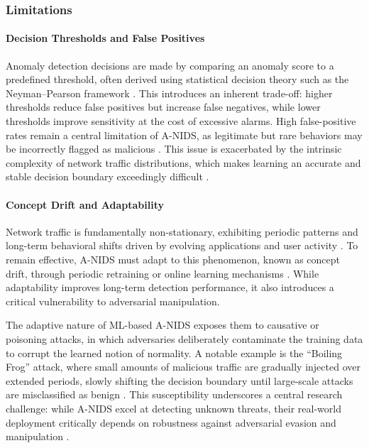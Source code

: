 \subsubsection{Limitations}
\paragraph{Decision Thresholds and False Positives}
Anomaly detection decisions are made by comparing an anomaly score to a predefined threshold, often derived using statistical decision theory such as the Neyman–Pearson framework \cite{brauckhoff2009applying}. This introduces an inherent trade-off: higher thresholds reduce false positives but increase false negatives, while lower thresholds improve sensitivity at the cost of excessive alarms. High false-positive rates remain a central limitation of A-NIDS, as legitimate but rare behaviors may be incorrectly flagged as malicious \cite{madani2018robustness}. This issue is exacerbated by the intrinsic complexity of network traffic distributions, which makes learning an accurate and stable decision boundary exceedingly difficult \cite{bao2018mitigating}.

\paragraph{Concept Drift and Adaptability}
Network traffic is fundamentally non-stationary, exhibiting periodic patterns and long-term behavioral shifts driven by evolving applications and user activity \cite{madani2018robustness}. To remain effective, A-NIDS must adapt to this phenomenon, known as concept drift, through periodic retraining or online learning mechanisms \cite{vitorino2023sok}. While adaptability improves long-term detection performance, it also introduces a critical vulnerability to adversarial manipulation.

The adaptive nature of ML-based A-NIDS exposes them to causative or poisoning attacks, in which adversaries deliberately contaminate the training data to corrupt the learned notion of normality. A notable example is the “Boiling Frog” attack, where small amounts of malicious traffic are gradually injected over extended periods, slowly shifting the decision boundary until large-scale attacks are misclassified as benign \cite{rubinstein2009antidote}. This susceptibility underscores a central research challenge: while A-NIDS excel at detecting unknown threats, their real-world deployment critically depends on robustness against adversarial evasion and manipulation \cite{apruzzese2024adversarial}.

